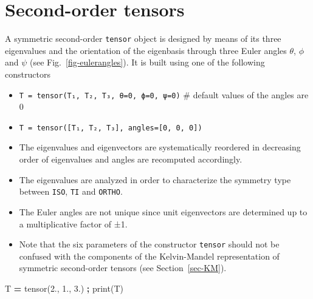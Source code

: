 \documentclass[
  a4paper,
  numbers=noendperiod,
  DIV=12]{scrreprt}
\newenvironment{Shaded}{\begin{snugshade}}{\end{snugshade}}
\newcommand{\BuiltInTok}[1]{#1}
\newcommand{\FloatTok}[1]{\textcolor[rgb]{0.00,0.00,0.81}{#1}}
\newcommand{\NormalTok}[1]{#1}
\newcommand{\OperatorTok}[1]{\textcolor[rgb]{0.81,0.36,0.00}{\textbf{#1}}}
\providecommand{\tightlist}{%
  \setlength{\itemsep}{0pt}\setlength{\parskip}{0pt}}
\begin{document}
\section{Second-order tensors}\label{second-order-tensors}

A symmetric second-order \texttt{tensor} object is designed by means of
its three eigenvalues and the orientation of the eigenbasis through
three Euler angles \(\theta\), \(\phi\) and \(\psi\) (see
Fig.~\ref{fig-eulerangles}). It is built using one of the following
constructors

\begin{itemize}
\tightlist
\item
  \texttt{T\ =\ tensor(T₁,\ T₂,\ T₃,\ θ=0,\ ϕ=0,\ ψ=0)} \# default
  values of the angles are 0
\item
  \texttt{T\ =\ tensor({[}T₁,\ T₂,\ T₃{]},\ angles={[}0,\ 0,\ 0{]})}
\end{itemize}

\begin{tcolorbox}[enhanced jigsaw, arc=.35mm, bottomrule=.15mm, bottomtitle=1mm, breakable, colback=white, colbacktitle=quarto-callout-warning-color!10!white, colframe=quarto-callout-warning-color-frame, coltitle=black, left=2mm, leftrule=.75mm, opacityback=0, opacitybacktitle=0.6, rightrule=.15mm, title=\textcolor{quarto-callout-warning-color}{\faExclamationTriangle}\hspace{0.5em}{Warning}, titlerule=0mm, toprule=.15mm, toptitle=1mm]

\begin{itemize}
\tightlist
\item
  The eigenvalues and eigenvectors are systematically reordered in
  decreasing order of eigenvalues and angles are recomputed accordingly.
\item
  The eigenvalues are analyzed in order to characterize the symmetry
  type between \texttt{ISO}, \texttt{TI} and \texttt{ORTHO}.
\item
  The Euler angles are not unique since unit eigenvectors are determined
  up to a multiplicative factor of ±1.
\item
  Note that the six parameters of the constructor \texttt{tensor} should
  not be confused with the components of the Kelvin-Mandel
  representation of symmetric second-order tensors (see
  Section~\ref{sec-KM}).
\end{itemize}

\end{tcolorbox}

\begin{Shaded}
\begin{Highlighting}[]
\NormalTok{T }\OperatorTok{=}\NormalTok{ tensor(}\FloatTok{2.}\NormalTok{, }\FloatTok{1.}\NormalTok{, }\FloatTok{3.}\NormalTok{) }\OperatorTok{;} \BuiltInTok{print}\NormalTok{(T)}
\end{Highlighting}
\end{Shaded}
\end{document}
